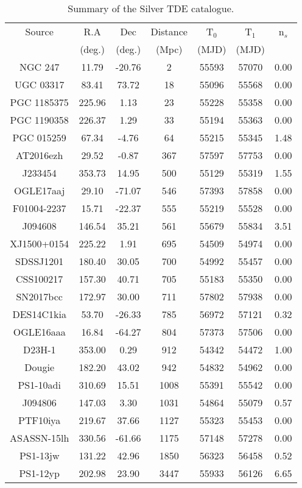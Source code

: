 \begin{table*}
	\centering
	\begin{tabular}{|c | c c c | c c | c |} 
		\hline
		Source & R.A & Dec & Distance & T$_{0}$ & T$_{1}$ & n$_{s}$ \\
		& (deg.) & (deg.) & (Mpc) & (MJD) & (MJD) & \\
		\hline
		NGC 247 & 11.79 & -20.76 & 2 & 55593 & 57070  & 0.00 \\
		UGC 03317 & 83.41 & 73.72 & 18 & 55096 & 55568  & 0.00 \\
		PGC 1185375 & 225.96 & 1.13 & 23 & 55228 & 55358  & 0.00 \\
		PGC 1190358 & 226.37 & 1.29 & 33 & 55194 & 55363  & 0.00 \\
		PGC 015259 & 67.34 & -4.76 & 64 & 55215 & 55345  & 1.48 \\
		AT2016ezh & 29.52 & -0.87 & 367 & 57597 & 57753  & 0.00 \\
		J233454 & 353.73 & 14.95 & 500 & 55129 & 55319  & 1.55 \\
		OGLE17aaj & 29.10 & -71.07 & 546 & 57393 & 57858  & 0.00 \\
		F01004-2237 & 15.71 & -22.37 & 555 & 55219 & 55528  & 0.00 \\
		J094608 & 146.54 & 35.21 & 561 & 55679 & 55834  & 3.51 \\
		XJ1500+0154 & 225.22 & 1.91 & 695 & 54509 & 54974  & 0.00 \\
		SDSSJ1201 & 180.40 & 30.05 & 700 & 54992 & 55457  & 0.00 \\
		CSS100217 & 157.30 & 40.71 & 705 & 55183 & 55350  & 0.00 \\
		SN2017bcc & 172.97 & 30.00 & 711 & 57802 & 57938  & 0.00 \\
		DES14C1kia & 53.70 & -26.33 & 785 & 56972 & 57121  & 0.32 \\
		OGLE16aaa & 16.84 & -64.27 & 804 & 57373 & 57506  & 0.00 \\
		D23H-1 & 353.00 & 0.29 & 912 & 54342 & 54472  & 1.00 \\
		Dougie & 182.20 & 43.02 & 942 & 54832 & 54962  & 0.00 \\
		PS1-10adi & 310.69 & 15.51 & 1008 & 55391 & 55542  & 0.00 \\
		J094806 & 147.03 & 3.30 & 1031 & 54864 & 55079  & 0.57 \\
		PTF10iya & 219.67 & 37.66 & 1127 & 55323 & 55453  & 0.00 \\
		ASASSN-15lh & 330.56 & -61.66 & 1175 & 57148 & 57278  & 0.00 \\
		PS1-13jw & 131.22 & 42.96 & 1850 & 56323 & 56458  & 0.52 \\
		PS1-12yp & 202.98 & 23.90 & 3447 & 55933 & 56126  & 6.65 \\
	\end{tabular}
	\caption{Summary of the Silver TDE catalogue.}
	\label{tab:silver_cat}
\end{table*}

